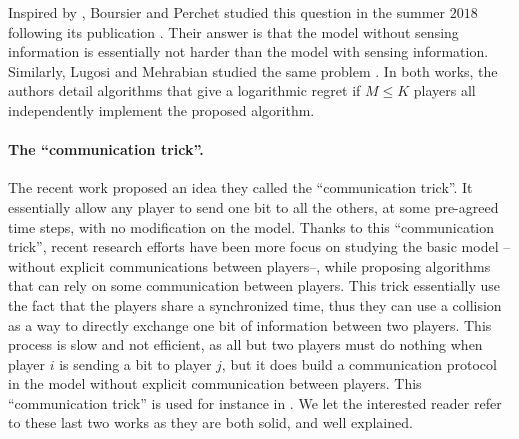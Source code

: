 Inspired by \cite{Besson2018ALT},
Boursier and Perchet studied this question in the summer $2018$ following its publication \cite{BoursierPerchet18}.
Their answer is that the model without sensing information is essentially not harder than the model with sensing information.
%
Similarly, Lugosi and Mehrabian studied the same problem \cite{LugosiMehrabian18}.
In both works, the authors detail algorithms that give a logarithmic regret if $M \leq K$ players all independently implement the proposed algorithm.


\paragraph{The ``communication trick''.}
%

The recent work \cite{BoursierPerchet18} proposed an idea they called the ``communication trick''.
It essentially allow any player to send one bit to all the others, at some pre-agreed time steps, with no modification on the model.
Thanks to this ``communication trick'', recent research efforts have been more focus on studying the basic model --without explicit communications between players--, while proposing algorithms that can rely on some communication between players.
This trick essentially use the fact that the players share a synchronized time, thus they can use a collision as a way to directly exchange one bit of information between two players.
This process is slow and not efficient, as all but two players must do nothing when player $i$ is sending a bit to player $j$, but it does build a communication protocol in the model without explicit communication between players.
This ``communication trick'' is used for instance in \cite{KaufmannAbbas19}.
We let the interested reader refer to these last two works \cite{BoursierPerchet18,KaufmannAbbas19} as they are both solid, and well explained.


